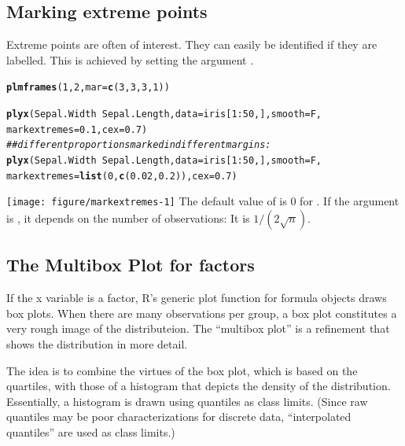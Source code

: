 \documentclass[11pt]{article}\usepackage[]{graphicx}\usepackage[]{color}
\makeatletter
\newcommand{\hlnum}[1]{\textcolor[rgb]{0.686,0.059,0.569}{#1}}%
\newcommand{\hlcom}[1]{\textcolor[rgb]{0.678,0.584,0.686}{\textit{#1}}}%
\newcommand{\hlopt}[1]{\textcolor[rgb]{0,0,0}{#1}}%
\newcommand{\hlstd}[1]{\textcolor[rgb]{0.345,0.345,0.345}{#1}}%
\newcommand{\hlkwc}[1]{\textcolor[rgb]{0.333,0.667,0.333}{#1}}%
\newcommand{\hlkwd}[1]{\textcolor[rgb]{0.737,0.353,0.396}{\textbf{#1}}}%
\newenvironment{kframe}{%
 \def\at@end@of@kframe{}%
 \ifinner\ifhmode%
  \def\at@end@of@kframe{\end{minipage}}%
  \begin{minipage}{\columnwidth}%
 \fi\fi%
 \def\FrameCommand##1{\hskip\@totalleftmargin \hskip-\fboxsep
 \colorbox{shadecolor}{##1}\hskip-\fboxsep
     \hskip-\linewidth \hskip-\@totalleftmargin \hskip\columnwidth}%
 \MakeFramed {\advance\hsize-\width
   \@totalleftmargin\z@ \linewidth\hsize
   \@setminipage}}%
 {\par\unskip\endMakeFramed%
 \at@end@of@kframe}
\newenvironment{knitrout}{}{} %
\makeatother
\begin{document}
\subsection{Marking extreme points}

Extreme points are often of interest. They can easily be identified if they 
are labelled. This is achieved by setting the argument .

\begin{knitrout}
\color{fgcolor}\begin{kframe}
\begin{alltt}
\hlkwd{plmframes}\hlstd{(}\hlnum{1}\hlstd{,}\hlnum{2}\hlstd{,} \hlkwc{mar}\hlstd{=}\hlkwd{c}\hlstd{(}\hlnum{3}\hlstd{,}\hlnum{3}\hlstd{,}\hlnum{3}\hlstd{,}\hlnum{1}\hlstd{))}

\hlkwd{plyx}\hlstd{(Sepal.Width}\hlopt{~}\hlstd{Sepal.Length,} \hlkwc{data}\hlstd{=iris[}\hlnum{1}\hlopt{:}\hlnum{50}\hlstd{,],} \hlkwc{smooth}\hlstd{=F,}
     \hlkwc{markextremes}\hlstd{=}\hlnum{0.1}\hlstd{,} \hlkwc{cex}\hlstd{=}\hlnum{0.7}\hlstd{)}
\hlcom{## different proportions marked in different margins:}
\hlkwd{plyx}\hlstd{(Sepal.Width}\hlopt{~}\hlstd{Sepal.Length,} \hlkwc{data}\hlstd{=iris[}\hlnum{1}\hlopt{:}\hlnum{50}\hlstd{,],} \hlkwc{smooth}\hlstd{=F,}
     \hlkwc{markextremes}\hlstd{=}\hlkwd{list}\hlstd{(}\hlnum{0}\hlstd{,}\hlkwd{c}\hlstd{(}\hlnum{0.02}\hlstd{,}\hlnum{0.2}\hlstd{)),} \hlkwc{cex}\hlstd{=}\hlnum{0.7}\hlstd{)}
\end{alltt}
\end{kframe}
\texttt{[image: figure/markextremes-1]} 
\end{knitrout}
The default value of  is 0 for .
If the argument is , it depends on the number of 
observations: It is $1/(2\sqrt{n})$. 

\subsection{The Multibox Plot for factors}
If the x variable is a factor, R's generic plot function for formula objects
draws box plots.
When there are many observations per group, a box plot constitutes a 
very rough image of the distributeion.
The ``multibox plot'' is a refinement that shows the distribution in more
detail. 

The idea is to combine the virtues of the box plot, which is based on the
quartiles, with those of a histogram that depicts the density of the
distribution. 
Essentially, a histogram is drawn using quantiles as class limits.
(Since raw quantiles may be poor characterizations for discrete data,
``interpolated quantiles'' are used as class limits.)
\end{document}
